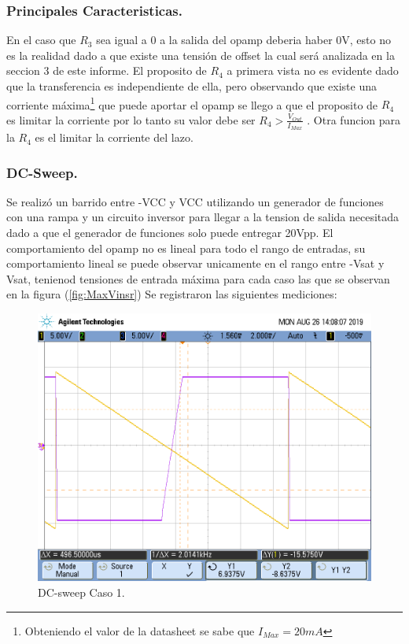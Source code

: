 \subsubsection{Principales Caracteristicas.}
En el caso que $R_3$ sea igual a 0 a la salida del opamp deberia haber 0V, esto no es la realidad dado a que existe una tensión de offset la cual será analizada en la seccion 3 de este informe.
El proposito de $R_4$ a primera vista no es evidente dado que la transferencia es independiente de ella, pero observando que existe una corriente máxima\footnote{Obteniendo el valor de la datasheet se sabe que $I_{Max}=20mA$} que puede aportar el opamp se llego a  que el proposito de $R_4$ es limitar la corriente por lo tanto su valor debe ser $R_4>\frac{V_{Out}}{I_{Max}}$ .
Otra funcion para la $R_4$ es el limitar la corriente del lazo.
\subsubsection{DC-Sweep.}
Se realizó un barrido entre -VCC y VCC utilizando un generador de funciones con una rampa y un circuito inversor para llegar a la tension de salida necesitada dado a que el generador de funciones solo puede entregar 20Vpp.
El comportamiento del opamp no es lineal para todo el rango de entradas, su comportamiento lineal se puede observar unicamente en el rango entre -Vsat y Vsat, tenienod tensiones de entrada máxima para cada caso las que se observan en la figura (\ref{fig:MaxVinsr})
Se registraron las siguientes mediciones:
\begin{figure}[H]	
	\centering
	\includegraphics[width=\textwidth]{Ejercicio1/Imagenes/dc_sweep_c1.png}
	\caption{DC-sweep Caso 1.}
	\label{fig:dcc1}
\end{figure} 
